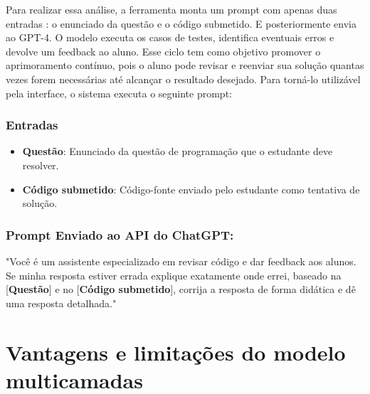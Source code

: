Para realizar essa análise, a ferramenta monta um prompt com apenas duas entradas : o enunciado da questão e o código submetido. E posteriormente envia ao GPT-4. O modelo executa os casos de testes, identifica eventuais erros e devolve um feedback ao aluno. Esse ciclo tem como objetivo promover o aprimoramento contínuo, pois o aluno pode revisar e reenviar sua solução quantas vezes forem necessárias até alcançar o resultado desejado.  Para torná-lo utilizável pela interface, o sistema executa o seguinte prompt: 

\subsubsection{Entradas}

\begin{itemize}
    \item \textbf{Questão}: Enunciado da questão de programação que o estudante deve resolver.
    \item \textbf{Código submetido}: Código-fonte enviado pelo estudante como tentativa de solução.
\end{itemize}

\subsubsection{Prompt Enviado ao API do ChatGPT:}

"Você é um assistente especializado em revisar código e dar feedback aos alunos. Se minha resposta estiver errada explique exatamente onde errei, baseado na [\textbf{Questão}] e no [\textbf{Código submetido}], corrija a resposta de forma didática e dê uma resposta detalhada."


\section{Vantagens e limitações do modelo multicamadas}


